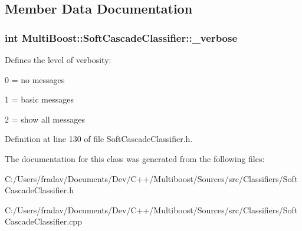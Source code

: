 \subsection{Member Data Documentation}
\hypertarget{classMultiBoost_1_1SoftCascadeClassifier_a5aea191918b57fc141dbe4cc83a15ba2}{
\subsubsection[{\-\_\-verbose}]{\setlength{\rightskip}{0pt plus 5cm}int Multi\-Boost\-::\-Soft\-Cascade\-Classifier\-::\-\_\-verbose\hspace{0.3cm}{\ttfamily [protected]}}}\label{classMultiBoost_1_1SoftCascadeClassifier_a5aea191918b57fc141dbe4cc83a15ba2}
Defines the level of verbosity\-:
\begin{DoxyItemize}
\item 0 = no messages
\item 1 = basic messages
\item 2 = show all messages 
\end{DoxyItemize}

Definition at line 130 of file Soft\-Cascade\-Classifier.\-h.



The documentation for this class was generated from the following files\-:\begin{DoxyCompactItemize}
\item 
C\-:/\-Users/fradav/\-Documents/\-Dev/\-C++/\-Multiboost/\-Sources/src/\-Classifiers/Soft\-Cascade\-Classifier.\-h\item 
C\-:/\-Users/fradav/\-Documents/\-Dev/\-C++/\-Multiboost/\-Sources/src/\-Classifiers/Soft\-Cascade\-Classifier.\-cpp\end{DoxyCompactItemize}
